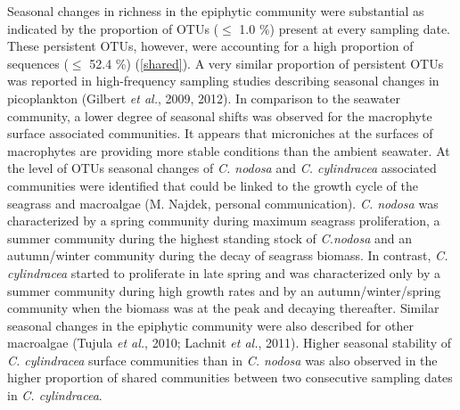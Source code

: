 \documentclass[12pt,]{article}
\begin{document}
Seasonal changes in richness in the epiphytic community were substantial
as indicated by the proportion of OTUs (\(\leq\) 1.0 \si{\percent})
present at every sampling date. These persistent OTUs, however, were
accounting for a high proportion of sequences (\(\leq\) 52.4
\si{\percent}) (\autoref{shared}). A very similar proportion of
persistent OTUs was reported in high-frequency sampling studies
describing seasonal changes in picoplankton (Gilbert \emph{et al.},
2009, 2012). In comparison to the seawater community, a lower degree of
seasonal shifts was observed for the macrophyte surface associated
communities. It appears that microniches at the surfaces of macrophytes
are providing more stable conditions than the ambient seawater. At the
level of OTUs seasonal changes of \emph{C. nodosa} and \emph{C.
cylindracea} associated communities were identified that could be linked
to the growth cycle of the seagrass and macroalgae (M. Najdek, personal
communication). \emph{C. nodosa} was characterized by a spring community
during maximum seagrass proliferation, a summer community during the
highest standing stock of \emph{C.nodosa} and an autumn/winter community
during the decay of seagrass biomass. In contrast, \emph{C. cylindracea}
started to proliferate in late spring and was characterized only by a
summer community during high growth rates and by an autumn/winter/spring
community when the biomass was at the peak and decaying thereafter.
Similar seasonal changes in the epiphytic community were also described
for other macroalgae (Tujula \emph{et al.}, 2010; Lachnit \emph{et al.},
2011). Higher seasonal stability of \emph{C. cylindracea} surface
communities than in \emph{C. nodosa} was also observed in the higher
proportion of shared communities between two consecutive sampling dates
in \emph{C. cylindracea}.
\end{document}
